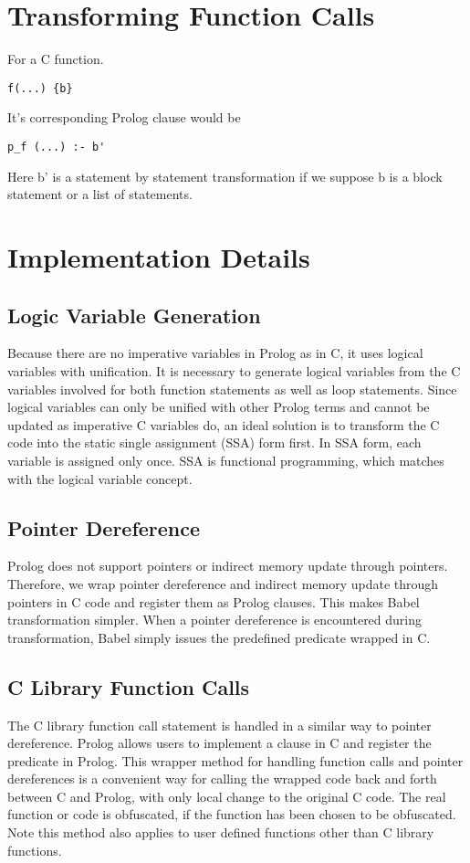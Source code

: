 \documentclass[11pt]{article}
\begin{document}
\section{Transforming Function Calls}
For a C function.
\begin{lstlisting}[mathescape]
f(...) {b}	
\end{lstlisting}
It's corresponding Prolog clause would be
\begin{lstlisting}[mathescape]
p_f (...) :- b'	
\end{lstlisting}
Here b' is a statement by statement transformation if we suppose b is a block statement or a list of statements.
\section{Implementation Details}
\subsection{Logic Variable Generation}
Because there are no imperative variables in Prolog as in C, it uses logical variables with unification. It is necessary to generate logical variables from the C variables involved for both function statements as well as loop statements.
Since logical variables can only be unified with other Prolog terms and cannot be updated as imperative C variables do, an ideal solution is to transform the C code into the static single assignment (SSA) form first. In SSA form, each variable is assigned only once. SSA is functional programming, which matches with the logical variable concept.
\subsection{Pointer Dereference}
Prolog does not support pointers or indirect memory update through pointers. Therefore, we wrap pointer dereference and indirect memory update through pointers in C code and register them as Prolog clauses. This makes Babel transformation simpler. When a pointer dereference is encountered during transformation, Babel simply issues the predefined predicate wrapped in C.
\subsection{C Library Function Calls}
The C library function call statement is handled in a similar way to pointer dereference. Prolog allows users to implement a clause in C and register the predicate in Prolog. This wrapper method for handling function calls and pointer dereferences is a convenient way for calling the wrapped code back and forth between C and Prolog, with only local change to the original C code. The real function or code is obfuscated, if the function has been chosen to be obfuscated. Note this method also applies to user defined functions other than C library functions.
\end{document}
